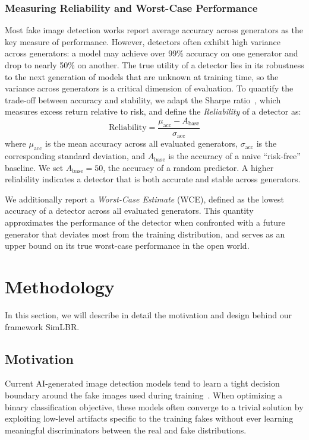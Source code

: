 \subsubsection{Measuring Reliability and Worst-Case Performance}
\label{sec:reliability}
Most fake image detection works report average accuracy across generators as the key measure of performance. However, detectors often exhibit high variance across generators: a model may achieve over 99\% accuracy on one generator and drop to nearly 50\% on another. The true utility of a detector lies in its robustness to the next generation of models that are unknown at training time, so the variance across generators is a critical dimension of evaluation. To quantify the trade-off between accuracy and stability, we adapt the Sharpe ratio~\cite{sharpe1994ratio}, which measures excess return relative to risk, and define the \textit{Reliability} of a detector as:
\begin{equation}
\text{Reliability} = \frac{\mu_{\text{acc}} - A_{\text{base}}}{\sigma_{\text{acc}}}
\label{eq:reliability}
\end{equation}
where $\mu_{\text{acc}}$ is the mean accuracy across all evaluated generators, $\sigma_{\text{acc}}$ is the corresponding standard deviation, and $A_{\text{base}}$ is the accuracy of a naive ``risk-free'' baseline. We set $A_{\text{base}}=50$, the accuracy of a random predictor. A higher reliability indicates a detector that is both accurate and stable across generators.

We additionally report a \textit{Worst-Case Estimate} (WCE), defined as the lowest accuracy of a detector across all evaluated generators. This quantity approximates the performance of the detector when confronted with a future generator that deviates most from the training distribution, and serves as an upper bound on its true worst-case performance in the open world.

\section{Methodology}
In this section, we will describe in detail the motivation and design behind our framework SimLBR. 
\label{sec:method}
\subsection{Motivation}
Current AI-generated image detection models tend to learn a tight decision boundary around the fake images used during training~\cite{rajan2025staypositive}. When optimizing a binary classification objective, these models often converge to a trivial solution by exploiting low-level artifacts specific to the training fakes without ever learning meaningful discriminators between the real and fake distributions.

